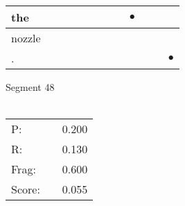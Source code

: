 \documentclass[landscape]{article}
\newcommand{\ssp}{\hspace{2pt}}
\newcommand{\mex}{\cellcolor{g}$\bullet$}
\begin{document}
\begin{tabular}{|l|p{10pt}|p{10pt}|p{10pt}|p{10pt}|p{10pt}|p{10pt}|p{10pt}|p{10pt}|p{10pt}|p{10pt}|p{10pt}|}
\hline
\ssp \cellcolor{ref7}the \ssp&\hspace{2pt}&\hspace{2pt}&\hspace{2pt}&\hspace{2pt}&\hspace{2pt}&\hspace{2pt}&\hspace{2pt}&\hspace{2pt}\mex&\hspace{2pt}&\hspace{2pt}&\hspace{2pt}\\
\hline
\ssp nozzle \ssp&\hspace{2pt}&\hspace{2pt}&\hspace{2pt}&\hspace{2pt}&\hspace{2pt}&\hspace{2pt}&\hspace{2pt}&\hspace{2pt}&\hspace{2pt}&\hspace{2pt}&\hspace{2pt}\\
\hline
\ssp \cellcolor{ref10}. \ssp&\hspace{2pt}&\hspace{2pt}&\hspace{2pt}&\hspace{2pt}&\hspace{2pt}&\hspace{2pt}&\hspace{2pt}&\hspace{2pt}&\hspace{2pt}&\hspace{2pt}&\hspace{2pt}\mex\\
\hline
\end{tabular}

\vspace{6pt}
\noindent Segment 48\\\\
\noindent\begin{tabular}{lm{12pt}r}
\hline
P:&&0.200\\
R:&&0.130\\
Frag:&&0.600\\
Score:&&0.055\\
\end{tabular}
\end{document}
